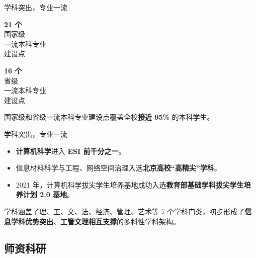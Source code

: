 \documentclass[aspectratio=169, utf8, fontset=windows]{beamer}
\begin{document}
\begin{frame}{学科突出，专业一流}
    \begin{multicols}{2}
        \begin{center}
            \LARGE\textcolor{Fore}{\textbf{21 个}}\\[0.5em]

            \normalsize 国家级\\一流本科专业\\建设点
        \end{center}

        \begin{center}
            \LARGE\textcolor{Fore}{\textbf{16 个}}\\[0.5em]

            \normalsize 省级\\一流本科专业\\建设点
        \end{center}
    \end{multicols}

    国家级和省级一流本科专业建设点覆盖全校\textcolor{Fore}{\textbf{接近 95\%}} 的本科学生。
\end{frame}

\begin{frame}{学科突出，专业一流}
    \begin{itemize}
        \item \textcolor{Fore}{\textbf{计算机科学}}进入 \textcolor{Fore}{\textbf{ESI 前千分之一}}。
        \item 信息材料科学与工程、网络空间治理入选\textcolor{Fore}{\textbf{北京高校“高精尖”学科}}。
        \item 2021 年，计算机科学拔尖学生培养基地成功入选\textcolor{Fore}{\textbf{教育部基础学科拔尖学生培养计划 2.0 基地}}。
    \end{itemize}

    学科涵盖了理、工、文、法、经济、管理、艺术等 7 个学科门类，初步形成了\textcolor{Fore}{\textbf{信息学科优势突出}}、\textcolor{Fore}{\textbf{工管文理相互支撑}}的多科性学科架构。
\end{frame}

\subsection*{师资科研}
\end{document}
